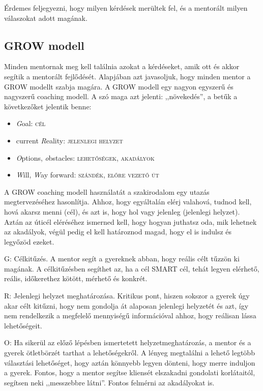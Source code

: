 Érdemes feljegyezni, hogy milyen kérdések merültek fel, és a mentorált
milyen válaszokat adott magának.

\hypertarget{grow-modell}{%
\subsection{GROW modell}\label{grow-modell}}

Minden mentornak meg kell találnia azokat a kérdéseket, amik ott és
akkor segítik a mentorált fejlődését. Alapjában azt javasoljuk, hogy
minden mentor a GROW modellt szabja magára. A GROW modell egy nagyon
egyszerű és nagyszerű coaching modell. A szó maga azt jelenti:
,,növekedés'', a betűk a következőket jelentik benne:

\begin{itemize}
\tightlist
\item
  \emph{G}oal: \textsc{cél}
\item
  current \emph{R}eality: \textsc{jelenlegi helyzet}
\item
  \emph{O}ptions, \emph{o}bstacles: \textsc{lehetőségek, akadályok}
\item
  \emph{W}ill, \emph{W}ay forward: \textsc{szándék, előre vezető út}
\end{itemize}

A GROW coaching modell használatát a szakirodalom egy utazás\break
megtervezéséhez hasonlítja. Ahhoz, hogy egyáltalán elérj valahová,
tudnod kell, hová akarsz menni (cél), és azt is, hogy hol vagy jelenleg
(jelenlegi helyzet). Aztán az úticél eléréséhez ismerned kell, hogy
hogyan juthatsz oda, mik lehetnek az akadályok, végül pedig el kell
határoznod magad, hogy el is indulsz és legyőzöd ezeket.

G: Célkitűzés. A mentor segít a gyereknek abban, hogy reális célt tűzzön
ki magának. A célkitűzésben segíthet az, ha a cél SMART cél, tehát
legyen elérhető, reális, időkerethez kötött, mérhető és konkrét.

R: Jelenlegi helyzet meghatározása. Kritikus pont, hiszen sokszor a
gyerek úgy akar célt kitűzni, hogy nem gondolja át alaposan jelenlegi
helyzetét és azt, így nem rendelkezik a megfelelő mennyiségű
információval ahhoz, hogy reálisan lássa lehetőségeit.

O: Ha sikerül az előző lépésben ismertetett helyzetmeghatározás, a
mentor és a gyerek ötletbörzét tarthat a lehetőségekről. A lényeg
megtalálni a lehető legtöbb választási lehetőséget, hogy aztán könnyebb
legyen dönteni, hogy merre induljon a gyerek. Fontos, hogy a mentor
segítse kliensét elszakadni gondolati korlátaitól, segítsen neki
,,messzebbre látni''. Fontos felmérni az akadályokat is.

